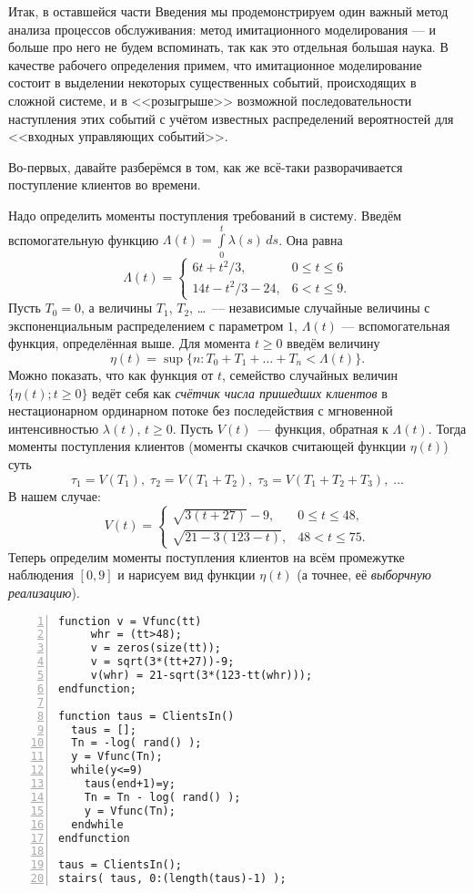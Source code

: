 \documentclass[14pt]{extarticle}
\theoremstyle{theorem}
\theoremstyle{remark}
\begin{document}
Итак, в оставшейся части Введения мы продемонстрируем один важный метод анализа
процессов обслуживания: метод имитационного моделирования --- и больше про него
не будем вспоминать, так как это отдельная большая наука. В качестве рабочего
определения примем, что имитационное моделирование состоит в выделении некоторых
существенных событий, происходящих в сложной системе, и в <<розыгрыше>>
возможной последовательности наступления этих событий с учётом известных
распределений вероятностей для <<входных управляющих событий>>. 

Во-первых, давайте разберёмся в том, как же всё-таки разворачивается поступление
клиентов во времени.

Надо определить моменты поступления требований в систему. Введём вспомогательную
функцию $\Lambda(t)=\int\limits_0^t \lambda(s)\,ds$. Она равна
\[
\Lambda(t)=\begin{cases}
  6t+t^2/3,& 0\leq t\leq 6\\
  14t-t^2/3-24,& 6< t \leq 9.
\end{cases}
\]
Пусть $T_0=0$, а величины $T_1$, $T_2$, \ldots~--- независимые случайные
величины с экспоненциальным распределением с параметром $1$, $\Lambda(t)$ ---
вспомогательная функция, определённая выше. Для момента $t\ge0$ введём величину
\[
\eta(t)=\sup\{n\colon T_0+T_1+\ldots+T_n<\Lambda(t)\}.
\]
Можно показать, что как функция от $t$, семейство случайных величин $\{\eta(t);
t\ge0\}$ ведёт себя как \emph{счётчик числа пришедших клиентов} в нестационарном
ординарном потоке без последействия с мгновенной интенсивностью $\lambda(t)$,
$t\ge0$. Пусть $V(t)$~--- функция, обратная к $\Lambda(t)$. Тогда моменты
поступления клиентов (моменты скачков считающей функции $\eta(t)$) суть 
\[
\tau_1=V(T_1), \; \tau_2=V(T_1+T_2),\; \tau_3=V(T_1+T_2+T_3),\; \ldots
\]
В нашем случае:
\[
V(t)=
\begin{cases}
  \sqrt{3(t+27)}-9,& 0\le t\le 48,\\
  \sqrt{21-3(123-t)},& 48< t\leq 75.
\end{cases}
\]
Теперь определим моменты поступления клиентов на всём промежутке наблюдения $[0,
9]$ и нарисуем вид функции $\eta(t)$ (а точнее, её \emph{выборчную реализацию}).
\begin{Verbatim}[frame=single,xleftmargin=2em,numbers=left]
function v = Vfunc(tt)
	 whr = (tt>48);
	 v = zeros(size(tt));
	 v = sqrt(3*(tt+27))-9;
	 v(whr) = 21-sqrt(3*(123-tt(whr)));
endfunction;

function taus = ClientsIn()
  taus = [];
  Tn = -log( rand() );
  y = Vfunc(Tn);
  while(y<=9)
    taus(end+1)=y;
    Tn = Tn - log( rand() );
    y = Vfunc(Tn);
  endwhile
endfunction

taus = ClientsIn();
stairs( taus, 0:(length(taus)-1) );
\end{Verbatim}
\end{document}
